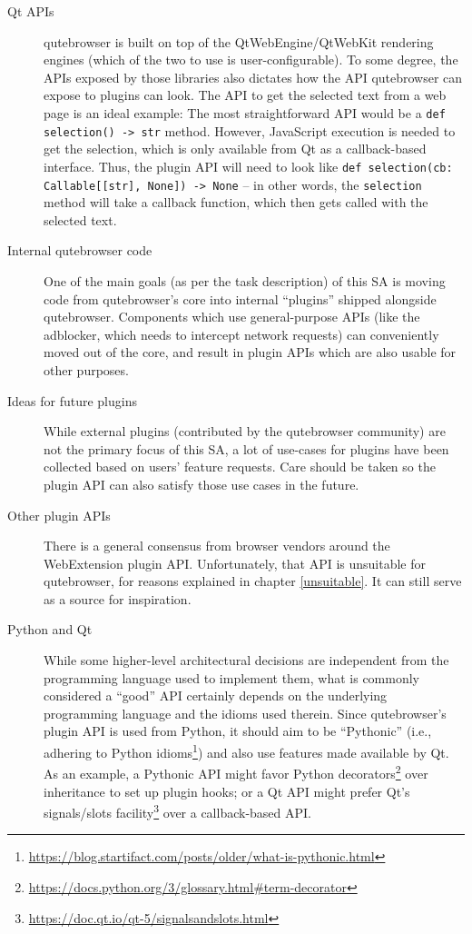 \documentclass[a4paper,parskip=full]{scrreprt}
\newcommand{\py}[1]{\texttt{#1}}
\begin{document}
\begin{description}
\item[Qt APIs] qutebrowser is built on top of the QtWebEngine/QtWebKit
rendering engines (which of the two to use is user-configurable). To some
degree, the APIs exposed by those libraries also dictates how the API
qutebrowser can expose to plugins can look. The API to get the selected text
from a web page is an ideal example: The most straightforward API would be a
\py{def selection() -> str} method. However, JavaScript execution is needed to get
the selection, which is only available from Qt as a callback-based interface.
Thus, the plugin API will need to look like
\py{def selection(cb: Callable[[str], None]) -> None} --
in other words, the \py{selection} method will take a
callback function, which then gets called with the selected text.

\item[Internal qutebrowser code] One of the main goals (as per the task
description) of this SA is moving code from qutebrowser's core into internal
``plugins'' shipped alongside qutebrowser. Components which use general-purpose
APIs (like the adblocker, which needs to intercept network requests) can
conveniently moved out of the core, and result in plugin APIs which are also
usable for other purposes.

\item[Ideas for future plugins] While external plugins (contributed by the
qutebrowser community) are not the primary focus of this SA, a lot of use-cases
for plugins have been collected based on users' feature requests. Care should be
taken so the plugin API can also satisfy those use cases in the future.

\item[Other plugin APIs] There is a general consensus from browser vendors
around the WebExtension plugin API. Unfortunately, that API is unsuitable for
qutebrowser, for reasons explained in chapter \ref{unsuitable}. It can still
serve as a source for inspiration.

\item[Python and Qt] While some higher-level architectural decisions are
independent from the programming language used to implement them, what is
commonly considered a ``good'' API certainly depends on the underlying
programming language and the idioms used therein. Since qutebrowser's plugin API
is used from Python, it should aim to be ``Pythonic'' (i.e., adhering to Python
idioms\footnote{\url{https://blog.startifact.com/posts/older/what-is-pythonic.html}})
and also use features made available by Qt. As an example, a Pythonic API might
favor Python
decorators\footnote{\url{https://docs.python.org/3/glossary.html\#term-decorator}}
over inheritance to set up plugin hooks; or a Qt API might prefer Qt's
signals/slots
facility\footnote{\url{https://doc.qt.io/qt-5/signalsandslots.html}} over a
callback-based API.
\end{description}
\end{document}
